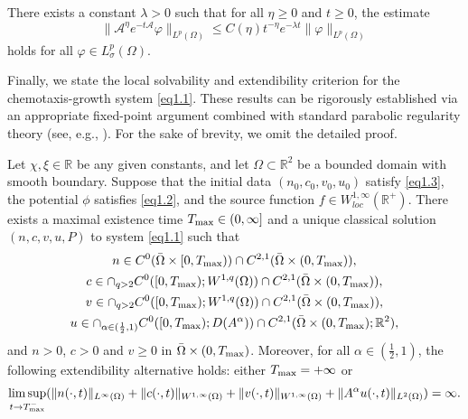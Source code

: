\documentclass[reqno]{amsart}
\begin{document}
\begin{lemma}\label{lem2.7} 
There exists a constant $\lambda > 0$ such that for all $\eta \geq 0$ and $t\geq 0$, 
the estimate
\begin{equation}\label{eq-2.9}
    \|\mathcal{A}^\eta e^{-t\mathcal{A}} \mathcal\varphi\|_{L^p(\Omega)} \leq C(\eta) t^{-\eta} e^{-\lambda t}  \|\varphi\|_{L^p(\Omega)}
\end{equation}
 holds for all $\varphi \in L_\sigma^p(\Omega)$.
\end{lemma}

Finally, we state the local solvability and extendibility criterion for the 
chemotaxis-growth system \eqref{eq1.1}. These results can be rigorously established 
via an appropriate fixed-point argument combined with standard parabolic regularity 
theory (see, e.g., \cite{Winkler2007,Winkler2010}). For the sake of brevity, 
we omit the detailed proof.

\begin{lemma}\label{lm2.8}
Let $\chi, \xi\in \mathbb{R}$ be any given constants, and let
$\Omega \subset \mathbb{R}^2$ be a bounded domain with smooth boundary. 
Suppose that the initial data $(n_0, c_0, v_0 , u_0)$ satisfy
\eqref{eq1.3}, the potential $\phi$ satisfies \eqref{eq1.2}, and the source function 
$f \in W_{loc}^{1,\infty}(\mathbb{R}^+)$. There exists
a maximal existence time $T_{\rm max} \in (0, \infty]$ and a unique classical solution
$(n, c, v, u, P)$ to system \eqref{eq1.1} such that
\begin{gather*}
n \in C^0(\bar{\Omega} \times [0, T_{\rm max})) \cap C^{2, 1}(\bar{\Omega}
 \times (0, T_{\rm max})), \\
c \in \cap_{q > 2} C^0([0, T_{\rm max}); W^{1, q}(\Omega)) \cap C^{2, 1}(\bar{\Omega}
 \times (0, T_{\rm max})), \\
v \in \cap_{q > 2} C^0([0, T_{\rm max}); W^{1, q}(\Omega)) \cap C^{2, 1}(\bar{\Omega}
 \times (0, T_{\rm max})), \\
u \in \cap_{\alpha \in (\frac{1}{2}, 1)} C^0([0, T_{\rm max}); D(A^\alpha)) 
\cap C^{2, 1}(\bar{\Omega} \times (0, T_{\rm max}); \mathbb{R}^2),
\end{gather*}
and $n > 0$, $c > 0$ and $v \geq 0$ in $\bar{\Omega} \times (0, T_{\rm max})$. 
Moreover, for all $\alpha \in (\frac{1}{2}, 1)$, the following extendibility alternative 
holds: either $T_{\rm max} = +\infty$ or
\[
\limsup_{t \to T_{\rm max}^-} ( \|n(\cdot, t)\|_{L^\infty(\Omega)} 
+ \| c(\cdot, t) \|_{W^{1,\infty}(\Omega)} + \|v(\cdot, t)\|_{W^{1,\infty}(\Omega)} +
\|A^\alpha u(\cdot, t)\|_{L^2(\Omega)} ) = \infty.
\]
\end{lemma}
\end{document}
